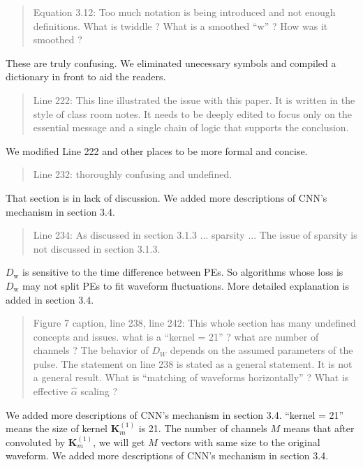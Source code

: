 \documentclass[12pt]{article}
\begin{document}
\begin{quote}
Equation 3.12: Too much notation is being introduced and not enough definitions. What is twiddle ? What is a smoothed ``w'' ? How was it smoothed ?
\end{quote}

These are truly confusing. We eliminated unecessary symbols and compiled a dictionary in front to aid the readers. 

\begin{quote}
Line 222: This line illustrated the issue with this paper. It is written in the style of class room notes. It needs to be deeply edited to focus only on the essential message and a single chain of logic that supports the conclusion.
\end{quote}

We modified Line 222 and other places to be more formal and concise.

\begin{quote}
Line 232: thoroughly confusing and undefined.
\end{quote}

That section is in lack of discussion. We added more descriptions of CNN's mechanism in section 3.4.

\begin{quote}
Line 234: As discussed in section 3.1.3 ... sparsity ... The issue of sparsity is not discussed in section 3.1.3.
\end{quote}

$D_\mathrm{w}$ is sensitive to the time difference between PEs. So algorithms whose loss is $D_\mathrm{w}$ may not split PEs to fit waveform fluctuations. More detailed explanation is added in section 3.4.

\begin{quote}
Figure 7 caption, line 238, line 242: This whole section has many undefined concepts and issues. what is a ``kernel = 21'' ? what are number of channels ? The behavior of $D_W$ depends on the assumed parameters of the pulse. The statement on line 238 is stated as a general statement. It is not a general result. What is ``matching of waveforms horizontally'' ? What is effective $\hat{\alpha}$ scaling ?
\end{quote}

We added more descriptions of CNN's mechanism in section 3.4. ``kernel = 21'' means the size of kernel $\bm{K}^{(1)}_m$ is 21. The number of channels $M$ means that after convoluted by $\bm{K}^{(1)}_m$, we will get $M$ vectors with same size to the original waveform. We added more descriptions of CNN's mechanism in section 3.4. 
\end{document}
